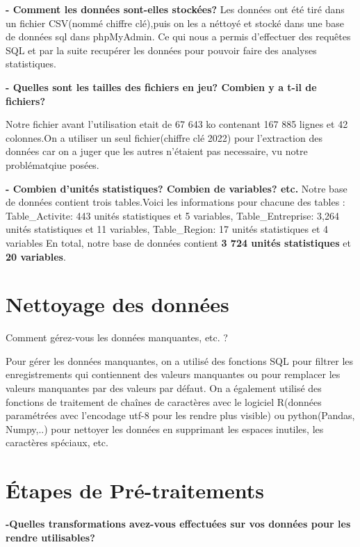 \documentclass[mstat,12pt]{unswthesis}
\begin{document}
\textbf{- Comment les données sont-elles stockées?} Les données ont été
tiré dans un fichier CSV(nommé chiffre clé),puis on les a néttoyé et
stocké dans une base de données sql dans phpMyAdmin. Ce qui nous a
permis d'effectuer des requêtes SQL et par la suite recupérer les
données pour pouvoir faire des analyses statistiques.

\textbf{- Quelles sont les tailles des fichiers en jeu? Combien y a t-il
de fichiers?}

Notre fichier avant l'utilisation etait de 67 643 ko contenant 167 885
lignes et 42 colonnes.On a utiliser un seul fichier(chiffre clé 2022)
pour l'extraction des données car on a juger que les autres n'étaient
pas necessaire, vu notre problématqiue posées.

\textbf{- Combien d'unités statistiques? Combien de variables? etc.}
Notre base de données contient trois tables.Voici les informations pour
chacune des tables : Table\_Activite: 443 unités statistiques et 5
variables, Table\_Entreprise: 3,264 unités statistiques et 11 variables,
Table\_Region: 17 unités statistiques et 4 variables \medskip En total,
notre base de données contient \textbf{3 724 unités statistiques} et
\textbf{20 variables}.

\hypertarget{nettoyage-des-donnuxe9es}{%
\section{Nettoyage des données}\label{nettoyage-des-donnuxe9es}}

Comment gérez-vous les données manquantes, etc. ?

Pour gérer les données manquantes, on a utilisé des fonctions SQL pour
filtrer les enregistrements qui contiennent des valeurs manquantes ou
pour remplacer les valeurs manquantes par des valeurs par défaut. On a
également utilisé des fonctions de traitement de chaînes de caractères
avec le logiciel R(données paramétrées avec l'encodage utf-8 pour les
rendre plus visible) ou python(Pandas, Numpy,..) pour nettoyer les
données en supprimant les espaces inutiles, les caractères spéciaux,
etc.

\hypertarget{uxe9tapes-de-pruxe9-traitements}{%
\section{Étapes de
Pré-traitements}\label{uxe9tapes-de-pruxe9-traitements}}

\textbf{-Quelles transformations avez-vous effectuées sur vos données
pour les rendre utilisables?}
\end{document}
